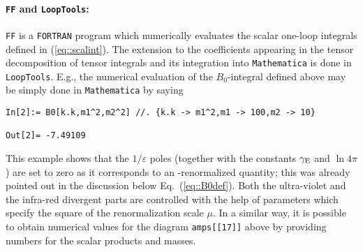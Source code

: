 \paragraph{{\tt FF} and {\tt LoopTools}:}
%
{\tt FF} is a {\tt FORTRAN} program which numerically evaluates the
scalar one-loop integrals defined in (\ref{eq::scalint}). The extension
to the coefficients appearing in the tensor decomposition of tensor
integrals and its integration into {\tt Mathematica} is done in {\tt
  LoopTools}.  E.g., the numerical evaluation of the $B_0$-integral
defined above may be simply done in {\tt Mathematica} by saying
\begin{verbatim}
In[2]:= B0[k.k,m1^2,m2^2] //. {k.k -> m1^2,m1 -> 100,m2 -> 10}

Out[2]= -7.49109
\end{verbatim}
This example shows that the $1/\varepsilon$ poles (together with the
constants $\gamma_{\rm E}$ and $\ln 4\pi$) are set to zero as it corresponds
to an \msbar-renormalized quantity; this was already pointed out in the
discussion below Eq.~(\ref{eq::B0def}). Both the ultra-violet and the
infra-red divergent parts are controlled with the help of parameters
which specify the square of the renormalization scale $\mu$.  In a
similar way, it is possible to obtain numerical values for the diagram
{\tt amps[[17]]} above by providing numbers for the scalar products and
masses.

